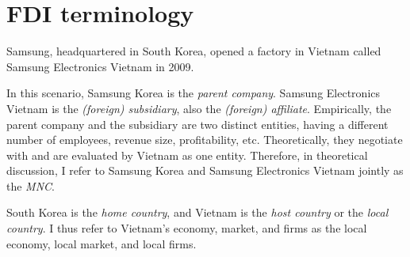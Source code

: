 \chapter{FDI terminology}

Samsung, headquartered in South Korea, opened a factory in Vietnam called
Samsung Electronics Vietnam in 2009.

In this scenario, Samsung Korea is the \textit{parent company}. Samsung
Electronics Vietnam is the \textit{(foreign) subsidiary}, also the
\textit{(foreign) affiliate}. Empirically, the parent company and the subsidiary
are two distinct entities, having a different number of employees, revenue size,
profitability, etc. Theoretically, they negotiate with and are evaluated by
Vietnam as one entity. Therefore, in theoretical discussion, I refer to Samsung
Korea and Samsung Electronics Vietnam jointly as the \textit{MNC}.

South Korea is the \textit{home country}, and Vietnam is the \textit{host
  country} or the \textit{local country}. I thus refer to Vietnam's economy,
market, and firms as the local economy, local market, and local firms.

